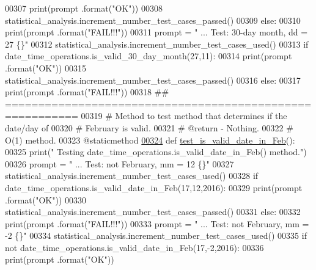\begin{DoxyCode}
00307             print(prompt .format(\textcolor{stringliteral}{"OK"}))
00308             statistical\_analysis.increment\_number\_test\_cases\_passed()
00309         \textcolor{keywordflow}{else}:
00310             print(prompt .format(\textcolor{stringliteral}{"FAIL!!!"}))
00311         prompt = \textcolor{stringliteral}{"  ... Test: 30-day month, dd = 27             \{\}"}
00312         statistical\_analysis.increment\_number\_test\_cases\_used()
00313         \textcolor{keywordflow}{if} date\_time\_operations.is\_valid\_30\_day\_month(27,11):
00314             print(prompt .format(\textcolor{stringliteral}{"OK"}))
00315             statistical\_analysis.increment\_number\_test\_cases\_passed()
00316         \textcolor{keywordflow}{else}:
00317             print(prompt .format(\textcolor{stringliteral}{"FAIL!!!"}))
00318     \textcolor{comment}{## =========================================================}
00319     \textcolor{comment}{#   Method to test method that determines if the date/day of}
00320     \textcolor{comment}{#       February is valid.}
00321     \textcolor{comment}{#   @return - Nothing.}
00322     \textcolor{comment}{#   O(1) method.}
00323     @staticmethod
\hypertarget{date__time__processing__tester_8py_source_l00324}{}\hyperlink{classutilities_1_1date__time__processing__tester_1_1date__time__operations__tester_a69aaf4f9d5369d9730be1c41980f6708}{00324}     \textcolor{keyword}{def }\hyperlink{classutilities_1_1date__time__processing__tester_1_1date__time__operations__tester_a69aaf4f9d5369d9730be1c41980f6708}{test\_is\_valid\_date\_in\_Feb}():
00325         print(\textcolor{stringliteral}{" Testing date\_time\_operations.is\_valid\_date\_in\_Feb() method."})
00326         prompt = \textcolor{stringliteral}{"  ... Test: not February, mm = 12             \{\}"}
00327         statistical\_analysis.increment\_number\_test\_cases\_used()
00328         \textcolor{keywordflow}{if} date\_time\_operations.is\_valid\_date\_in\_Feb(17,12,2016):
00329             print(prompt .format(\textcolor{stringliteral}{"OK"}))
00330             statistical\_analysis.increment\_number\_test\_cases\_passed()
00331         \textcolor{keywordflow}{else}:
00332             print(prompt .format(\textcolor{stringliteral}{"FAIL!!!"}))
00333         prompt = \textcolor{stringliteral}{"  ... Test: not February, mm = -2             \{\}"}
00334         statistical\_analysis.increment\_number\_test\_cases\_used()
00335         \textcolor{keywordflow}{if} \textcolor{keywordflow}{not} date\_time\_operations.is\_valid\_date\_in\_Feb(17,-2,2016):
00336             print(prompt .format(\textcolor{stringliteral}{"OK"}))

\end{DoxyCode}
